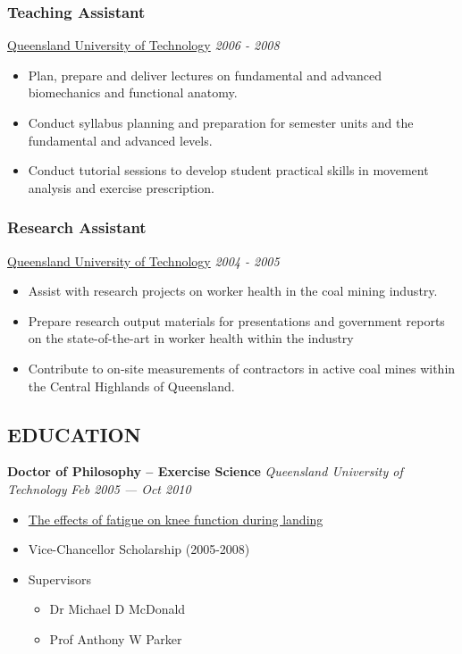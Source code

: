 \documentclass[
  letterpaper,
  DIV=11,
  numbers=noendperiod]{scrartcl}
\providecommand{\tightlist}{%
  \setlength{\itemsep}{0pt}\setlength{\parskip}{0pt}}\usepackage{longtable,booktabs,array}
\begin{document}
\subsubsection{Teaching Assistant}\label{teaching-assistant}

\href{www.qut.edu.au}{Queensland University of Technology} {\emph{2006 -
2008}}

\begin{itemize}
\tightlist
\item
  Plan, prepare and deliver lectures on fundamental and advanced
  biomechanics and functional anatomy.
\item
  Conduct syllabus planning and preparation for semester units and the
  fundamental and advanced levels.
\item
  Conduct tutorial sessions to develop student practical skills in
  movement analysis and exercise prescription.
\end{itemize}

\subsubsection{Research Assistant}\label{research-assistant}

\href{www.qut.edu.au}{Queensland University of Technology} {\emph{2004 -
2005}}

\begin{itemize}
\tightlist
\item
  Assist with research projects on worker health in the coal mining
  industry.
\item
  Prepare research output materials for presentations and government
  reports on the state-of-the-art in worker health within the industry
\item
  Contribute to on-site measurements of contractors in active coal mines
  within the Central Highlands of Queensland.
\end{itemize}

\subsection{EDUCATION}\label{education}

\textbf{Doctor of Philosophy -- Exercise Science} \emph{Queensland
University of Technology} {\emph{Feb 2005 --- Oct 2010}}

\begin{itemize}
\tightlist
\item
  \href{https://eprints.qut.edu.au/39314/}{The effects of fatigue on
  knee function during landing}
\item
  Vice-Chancellor Scholarship (2005-2008)
\item
  Supervisors

  \begin{itemize}
  \tightlist
  \item
    Dr Michael D McDonald
  \item
    Prof Anthony W Parker
  \end{itemize}
\end{itemize}
\end{document}
